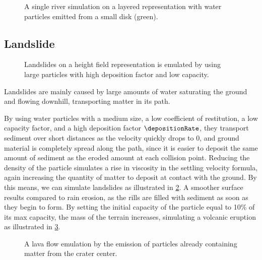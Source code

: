 \begin{figure}[H]
    \caption[River simulation]{A single river simulation on a layered representation with water particles emitted from a small disk (green).}
    \label{fig:erosion-results-river}
\end{figure}

\subsection{Landslide}

\begin{figure}[H]
    \caption[Landslide simulation]{Landslides on a height field representation is emulated by using large particles with high deposition factor and low capacity. }
    \label{fig:erosion-results-landslides}
\end{figure}

Landslides are mainly caused by large amounts of water saturating the ground and flowing downhill, transporting matter in its path.

By using water particles with a medium size, a low coefficient of restitution, a low capacity factor, and a high deposition factor $\depositionRate$, they transport sediment over short distances as the velocity quickly drops to 0, and ground material is completely spread along the path, since it is easier to deposit the same amount of sediment as the eroded amount at each collision point. Reducing the density of the particle simulates a rise in viscosity in the settling velocity formula, again increasing the quantity of matter to deposit at contact with the ground. By this means, we can simulate landslides as illustrated in \cref{fig:erosion-results-landslides}. A smoother surface results compared to rain erosion, as the rills are filled with sediment as soon as they begin to form. %
By setting the initial capacity of the particle equal to 10\% of its max capacity, the mass of the terrain increases, simulating a volcanic eruption as illustrated in \cref{fig:erosion-results-volcano}. %

\begin{figure}[H]
    \caption[Lava flow simulation]{A lava flow emulation by the emission of particles already containing matter from the crater center.}
    \label{fig:erosion-results-volcano}
\end{figure}

